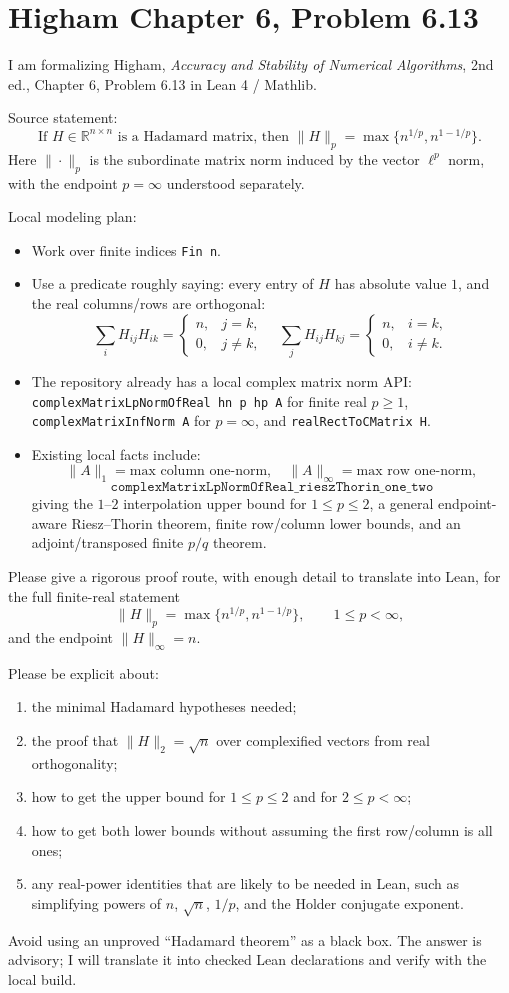 \documentclass{article}
\begin{document}
\section*{Higham Chapter 6, Problem 6.13}

I am formalizing Higham, \emph{Accuracy and Stability of Numerical Algorithms},
2nd ed., Chapter 6, Problem 6.13 in Lean 4 / Mathlib.

Source statement:
\[
  \text{If } H\in \mathbb{R}^{n\times n}\text{ is a Hadamard matrix, then }
  \|H\|_p=\max\{n^{1/p}, n^{1-1/p}\}.
\]
Here $\|\cdot\|_p$ is the subordinate matrix norm induced by the vector
$\ell^p$ norm, with the endpoint $p=\infty$ understood separately.

Local modeling plan:
\begin{itemize}
\item Work over finite indices \texttt{Fin n}.
\item Use a predicate roughly saying: every entry of $H$ has absolute value
  $1$, and the real columns/rows are orthogonal:
  \[
    \sum_i H_{i j} H_{i k} =
      \begin{cases} n,& j=k,\\0,& j\ne k,\end{cases}
    \quad
    \sum_j H_{i j} H_{k j} =
      \begin{cases} n,& i=k,\\0,& i\ne k.\end{cases}
  \]
\item The repository already has a local complex matrix norm API:
  \texttt{complexMatrixLpNormOfReal hn p hp A} for finite real $p\ge1$,
  \texttt{complexMatrixInfNorm A} for $p=\infty$, and
  \texttt{realRectToCMatrix H}.
\item Existing local facts include:
  \[
  \|A\|_1 = \text{max column one-norm},\quad
  \|A\|_\infty = \text{max row one-norm},
  \]
  \[
  \texttt{complexMatrixLpNormOfReal\_rieszThorin\_one\_two}
  \]
  giving the $1$--$2$ interpolation upper bound for $1\le p\le2$,
  a general endpoint-aware Riesz--Thorin theorem, finite row/column lower
  bounds, and an adjoint/transposed finite $p/q$ theorem.
\end{itemize}

Please give a rigorous proof route, with enough detail to translate into Lean,
for the full finite-real statement
\[
  \|H\|_p=\max\{n^{1/p}, n^{1-1/p}\}, \qquad 1\le p<\infty,
\]
and the endpoint $\|H\|_\infty=n$.

Please be explicit about:
\begin{enumerate}
\item the minimal Hadamard hypotheses needed;
\item the proof that $\|H\|_2=\sqrt n$ over complexified vectors from real
  orthogonality;
\item how to get the upper bound for $1\le p\le2$ and for $2\le p<\infty$;
\item how to get both lower bounds without assuming the first row/column is
  all ones;
\item any real-power identities that are likely to be needed in Lean, such as
  simplifying powers of $n$, $\sqrt n$, $1/p$, and the Holder conjugate
  exponent.
\end{enumerate}

Avoid using an unproved ``Hadamard theorem'' as a black box.  The answer is
advisory; I will translate it into checked Lean declarations and verify with
the local build.
\end{document}
